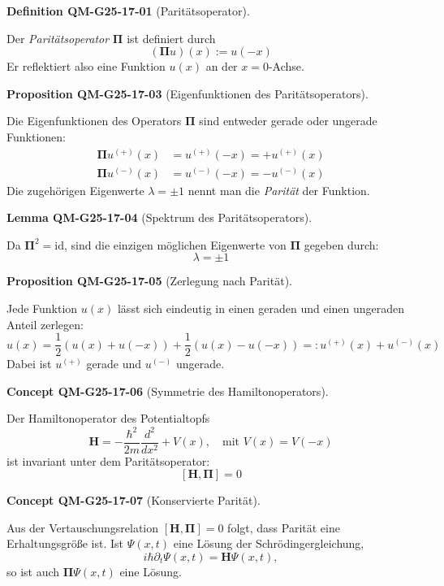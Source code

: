 \documentclass[10pt, letterpaper]{article}
\newcommand{\CustomHeading}[3]{%
  \par\medskip\noindent%
  \textbf{#1 #2} \textnormal{(#3)}.\enskip%
}
\newenvironment{DEF}[2]{\begin{unitbox}\CustomHeading{Definition}{#1}{#2}}{\end{unitbox}}
\newenvironment{PROP}[2]{\begin{unitbox}\CustomHeading{Proposition}{#1}{#2}}{\end{unitbox}}
\newenvironment{LEM}[2]{\begin{unitbox}\CustomHeading{Lemma}{#1}{#2}}{\end{unitbox}}
\newenvironment{CONC}[2]{\begin{unitbox}\CustomHeading{Concept}{#1}{#2}}{\end{unitbox}}
\begin{document}
\begin{DEF}{QM-G25-17-01}{Paritätsoperator}
Der \emph{Paritätsoperator} $\boldsymbol{\Pi}$ ist definiert durch
\[
(\boldsymbol{\Pi} u)(x) := u(-x)
\]
Er reflektiert also eine Funktion $u(x)$ an der $x=0$-Achse.
\end{DEF}



\begin{PROP}{QM-G25-17-03}{Eigenfunktionen des Paritätsoperators}
Die Eigenfunktionen des Operators $\boldsymbol{\Pi}$ sind entweder gerade oder ungerade Funktionen:
\[
\begin{aligned}
\boldsymbol{\Pi} u^{(+)}(x) &= u^{(+)}(-x) = +u^{(+)}(x) \\
\boldsymbol{\Pi} u^{(-)}(x) &= u^{(-)}(-x) = -u^{(-)}(x)
\end{aligned}
\]
Die zugehörigen Eigenwerte $\lambda = \pm 1$ nennt man die \emph{Parität} der Funktion.
\end{PROP}



\begin{LEM}{QM-G25-17-04}{Spektrum des Paritätsoperators}
Da $\boldsymbol{\Pi}^2 = \mathrm{id}$, sind die einzigen möglichen Eigenwerte von $\boldsymbol{\Pi}$ gegeben durch:
\[
\lambda = \pm 1
\]
\end{LEM}

\begin{PROP}{QM-G25-17-05}{Zerlegung nach Parität}
Jede Funktion $u(x)$ lässt sich eindeutig in einen geraden und einen ungeraden Anteil zerlegen:
\[
u(x) = \frac{1}{2}(u(x) + u(-x)) + \frac{1}{2}(u(x) - u(-x)) =: u^{(+)}(x) + u^{(-)}(x)
\]
Dabei ist $u^{(+)}$ gerade und $u^{(-)}$ ungerade.
\end{PROP}



\begin{CONC}{QM-G25-17-06}{Symmetrie des Hamiltonoperators}
Der Hamiltonoperator des Potentialtopfs
\[
\mathbf{H} = -\frac{\hbar^2}{2m} \frac{d^2}{dx^2} + V(x), \quad \text{mit } V(x) = V(-x)
\]
ist invariant unter dem Paritätsoperator:
\[
[\mathbf{H}, \boldsymbol{\Pi}] = 0
\]
\end{CONC}

\begin{CONC}{QM-G25-17-07}{Konservierte Parität}
Aus der Vertauschungsrelation $[\mathbf{H}, \boldsymbol{\Pi}] = 0$ folgt, dass Parität eine Erhaltungsgröße ist. Ist $\Psi(x,t)$ eine Lösung der Schrödingergleichung,
\[
i \hbar \partial_t \Psi(x,t) = \mathbf{H} \Psi(x,t),
\]
so ist auch $\boldsymbol{\Pi} \Psi(x,t)$ eine Lösung.
\end{CONC}
\end{document}

